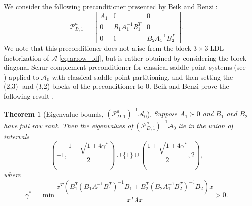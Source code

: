 \documentclass{article}
\newtheorem{theorem}{Theorem}
\newcommand{\sA}{\mathcal{A}}
\begin{document}
We consider the following preconditioner presented by Beik and Benzi \cite{bb18}:
\begin{equation}
    \mathcal{P}_{D,1}^a = \begin{bmatrix}
        A_1 & 0 & 0 \\
        0 & B_1 A_1^{-1}B_1^T & 0 \\
        0 & 0 & B_2 A_1^{-1}B_2^T
    \end{bmatrix}.
\end{equation}
We note that this preconditioner does not arise from the block-$3 \times 3$ LDL factorization of $\sA$ \eqref{eq:arrow_ldl}, but is rather obtained by considering the block-diagonal Schur complement preconditioner for classical saddle-point systems (see \cite{mgw00}) applied to $\sA_0$ with classical saddle-point partitioning, and then setting the (2,3)- and (3,2)-blocks of the preconditioner to 0. Beik and Benzi prove the following result \cite[Theorem 4.1]{bb18}.

\begin{theorem}[Eigenvalue bounds, $(\mathcal{P}_{D,1}^{a})^{-1} \sA_0$]
    Suppose $A_1 \succ 0$ and $B_1$ and $B_2$ have full row rank. Then the eigenvalues of $(\mathcal{P}_{D,1}^{a})^{-1} \sA_0$ lie in the union of intervals
    \[
    \left( -1, \frac{1-\sqrt{1+4\gamma^*}}{2} \right) \cup \{ 1 \} \cup \left( \frac{1+\sqrt{1+4\gamma^*}}{2}, 2\right),
    \]
    where
    \[
    \gamma^* = \min\frac{x^T \left( B_1^T (B_1A_1^{-1}B_1^T)^{-1} B_1 + B_2^T (B_2A_1^{-1}B_2^T)^{-1} B_2 \right)x}{x^TAx} > 0.
    \]
\end{theorem}
\end{document}
